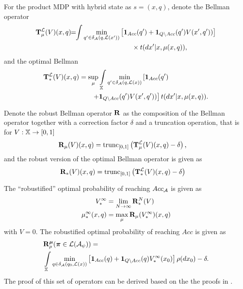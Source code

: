 \documentclass{ifacconf}
\newcommand{\red}[1]{{\color{red} #1}}
\begin{document}
\red{For the product MDP with hybrid state as $s=(x, q)$, denote the Bellman operator}
\begin{align}\label{eq:V_recopt_inf}
& \Bel_\pol^\Labset (V)(x,q) \!\!=\!\!\int%
\min_{q' \in \delta_\FSA(q, \Labset( x'))}\left[\mathbf 1_{Acc}(q')+  \mathbf 1_{Q\setminus Acc}(q')V( x',q'))\right]\notag\\&\hspace{5cm}\hfill \times{\tr}(d x'|x,\pol(x,q)),
\end{align}
and the optimal Bellman 
\begin{align}\label{eq:V_recopt_inf}
& \Bel_\ast^\Labset (V)(x,q) =\sup_\pol\int_{\X}\min_{ q' \in \delta_\FSA(q, \Labset(\bar x))}\left[\mathbf 1_{Acc}( q')\right.\hspace{1.5cm}\\&\left.\hspace{2.5cm}+  \mathbf 1_{Q\setminus Acc}( q')V( x', q'))\right]\notag {\tr}(d x'
|x,\pol(x,q)).
\end{align}



Denote the robust Bellman operator ${\mathbf {R}}$ as the composition of the Bellman operator together with a correction factor $\delta$ and  a truncation operation, that is for $V:{\mathbb{X}}\rightarrow [0,1]$
\begin{align}\label{eq:V_recopt_inf}
& {\mathbf {R}}_{\mu} (V)(x,q) = \mathop{\mathrm{trunc}}\nolimits_{[0,1]}\left({\mathbf {T}}_{\mu}^{\mathcal{L}} (V)(x,q)-\delta\right),
\end{align}
and the robust version of the optimal Bellman operator is given as 
\begin{align}\label{eq:V_recopt_inf}
& {\mathbf {R}}_\ast (V)(x,q)= \mathop{\mathrm{trunc}}\nolimits_{[0,1]}\left({\mathbf {T}}_\ast^{\mathcal{L}} (V)(x,q)-\delta\right)
\end{align}


The ``robustified'' optimal probability of reaching $Acc_{\mathcal{A}}$ is given as
\begin{align}
	V^\infty_\ast & =\lim_{N\rightarrow \infty}{\mathbf {R}}_\ast^N (V) \\
	{\mu}^\infty_\ast(x,q)  &= \max_{\mu} {\mathbf {R}}_{\mu} (V_\ast^\infty)(x,q) 
\end{align}
with $V=0$.
The robustified optimal probability of reaching $Acc$ is given as
\begin{align}
&\BelR_\init^\polb
(\word \in\mathcal L(\mathcal A_\psi))=\\ & \int_{\X}\min_{\bar q \in \delta_\FSA(q_0,\Labset(\bar x))}\left[\mathbf 1_{Acc}(\bar q)+ \mathbf 1_{Q \setminus Acc}(\bar q) V^\infty_\ast(x_0) \right]%
\init (d x_0)-\delta.
\end{align} 
The proof of this set of operators can be derived based on the the proofs in \citep{tech_report_TACAS}.
 
\end{document}
